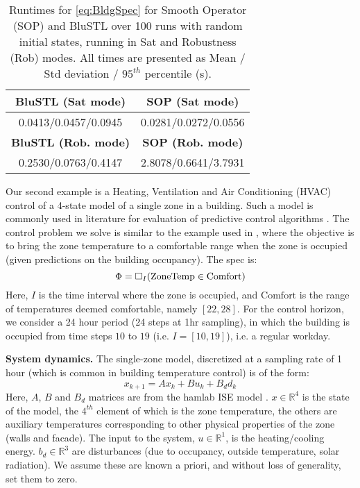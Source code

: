 \begin{table}[t]
	\begin{center}
		\caption{{\small Runtimes for \eqref{eq:BldgSpec} for Smooth Operator (SOP) and BluSTL over 100 runs with random initial states, running in Sat and Robustness (Rob) modes. All times are presented as Mean / Std deviation / $95^{th}$ percentile (s)}.}
		\vspace{-5pt}
		\label{tbl:bldg}
		\begin{tabular} {|c|c|}
			\hline
			\textbf{BluSTL (Sat mode)} &   \textbf{SOP (Sat mode)}
			\\ \hline
			0.0413/0.0457/0.0945 & 0.0281/0.0272/0.0556
			\\ \hline
			 \textbf{BluSTL (Rob. mode)} & \textbf{SOP (Rob. mode)}
			\\ \hline
			 0.2530/0.0763/0.4147 & 2.8078/0.6641/3.7931\\ \hline	
		\end{tabular}	
	\end{center}
	\vspace{-10pt}
\end{table}
Our second example is a Heating, Ventilation and Air Conditioning (HVAC) control of a 4-state model of a single zone in a building. 
Such a model is commonly used in literature for evaluation of predictive control algorithms \cite{Jain2016}. 
The control problem we solve is similar to the example used in \cite{Raman14_MPCSTL}, where the objective is to bring the zone temperature to a comfortable range when the zone is occupied (given predictions on the building occupancy). 
The spec is:
\begin{equation}
\label{eq:BldgSpec}
\Phi= \square_I(\text{ZoneTemp} \in \text{Comfort})
\end{equation}
Here, $I$ is the time interval where the zone is occupied, and $\text{Comfort}$ is the range of temperatures deemed comfortable, namely $[22,28]$. For the control horizon, we consider a 24 hour period (24 steps at 1hr sampling), in which the building is occupied from time steps $10$ to $19$ (i.e. $I=[10,19]$), i.e. a regular workday. 

\textbf{System dynamics.} The single-zone model, discretized at a sampling rate of 1 hour (which is common in building temperature control) is of the form:
\begin{equation}
\label{eq:bldg_dyn}
x_{k+1} = Ax_{k}+Bu_k+B_dd_k
\end{equation}
Here, $A$, $B$ and $B_d$ matrices are from the hamlab ISE model \cite{VanSchijndel2005}. $x \in \mathbb{R}^4$ is the state of the model, the $4^{th}$ element of which is the zone temperature, the others are auxiliary temperatures corresponding to other physical properties of the zone (walls and facade). 
The input to the system, $u \in \mathbb{R}^1$, is the heating/cooling energy. 
$b_d \in \mathbb{R}^3$ are disturbances (due to occupancy, outside temperature, solar radiation). 
We assume these are known a priori, and without loss of generality, set them to zero.

